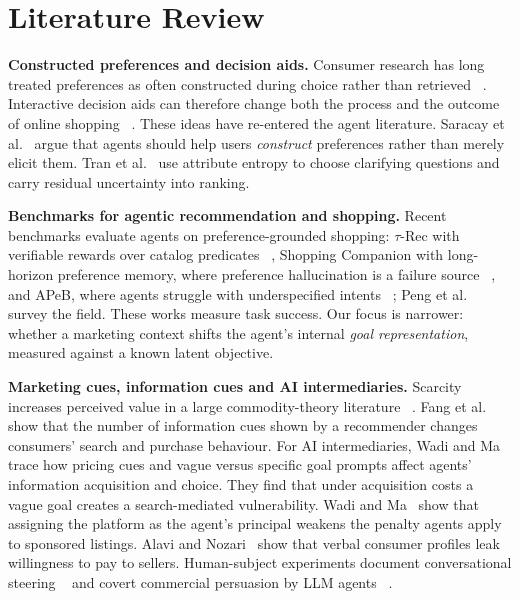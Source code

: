 \documentclass[conference]{IEEEtran}
\begin{document}
\section{Literature Review}

\textbf{Constructed preferences and decision aids.} Consumer research has long treated preferences as often constructed during choice rather than retrieved ~\cite{bettman1998constructive}. Interactive decision aids can therefore change both the process and the outcome of online shopping ~\cite{haubl2000consumer}. These ideas have re-entered the agent literature. Saracay et al.~\cite{saracay2026beyond} argue that agents should help users \emph{construct} preferences rather than merely elicit them. Tran et al.~\cite{tran2026entropy} use attribute entropy to choose clarifying questions and carry residual uncertainty into ranking.

\textbf{Benchmarks for agentic recommendation and shopping.} Recent benchmarks evaluate agents on preference-grounded shopping: $\tau$-Rec with verifiable rewards over catalog predicates ~\cite{narasimhan2026taurec}, Shopping Companion with long-horizon preference memory, where preference hallucination is a failure source ~\cite{yu2026shopping}, and APeB, where agents struggle with underspecified intents ~\cite{yang2026apeb}; Peng et al.~\cite{peng2025survey} survey the field. These works measure task success. Our focus is narrower: whether a marketing context shifts the agent's internal \emph{goal representation}, measured against a known latent objective.

\textbf{Marketing cues, information cues and AI intermediaries.} Scarcity increases perceived value in a large commodity-theory literature ~\cite{lynn1991scarcity}. Fang et al.~\cite{fang2025toomany} show that the number of information cues shown by a recommender changes consumers' search and purchase behaviour. For AI intermediaries, Wadi and Ma~\cite{wadi2026shopping} trace how pricing cues and vague versus specific goal prompts affect agents' information acquisition and choice. They find that under acquisition costs a vague goal creates a search-mediated vulnerability. Wadi and Ma~\cite{wadi2026whom} show that assigning the platform as the agent's principal weakens the penalty agents apply to sponsored listings. Alavi and Nozari~\cite{alavi2026agents} show that verbal consumer profiles leak willingness to pay to sellers. Human-subject experiments document conversational steering ~\cite{werner2024experimental} and covert commercial persuasion by LLM agents ~\cite{salvi2026commercial}.
\end{document}
